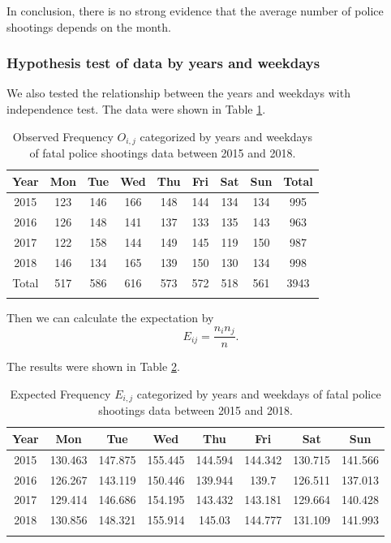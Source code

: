 \documentclass[conf]{new-aiaa}
\begin{document}
In conclusion, there is no strong evidence that the
average number of police shootings depends on the month.

\subsubsection{Hypothesis test of data by years and weekdays}

We also tested the relationship between the years and weekdays with independence test. The data were shown in Table \ref{tab:q4-year-day-obs}.

\begin{table}[!htbp]
\centering
\begin{tabular}{c|ccccccc|c}
\toprule 
\toprule
Year & Mon & Tue & Wed & Thu & Fri & Sat & Sun & Total \\
\hline
2015 & 123 & 146 & 166 & 148 & 144 & 134 & 134 & 995\\
2016 & 126 & 148 & 141 & 137 & 133 & 135 & 143 & 963\\
2017 & 122 & 158 & 144 & 149 & 145 & 119 & 150 & 987\\
2018 & 146 & 134 & 165 & 139 & 150 & 130 & 134 & 998\\
\hline
Total & 517 & 586 & 616 & 573 & 572 & 518 & 561 & 3943\\
\bottomrule 
\bottomrule\noalign{\bigskip}
\end{tabular}
\caption{Observed Frequency $O_{i,j}$ categorized by years and weekdays of fatal police shootings data between 2015 and 2018.}
\label{tab:q4-year-day-obs}
\end{table}

Then we can calculate the expectation by
$$E_{ij}=\frac{n_in_j}{n}.$$

The results were shown in Table \ref{tab:q4-year-day-exp}.

\begin{table}[!htbp]
\centering
\begin{tabular}{c|ccccccc}
\toprule 
\toprule
Year & Mon & Tue & Wed & Thu & Fri & Sat & Sun  \\
\hline
2015 & 130.463 & 147.875 & 155.445 & 144.594 & 144.342 & 130.715 & 141.566 \\
2016 & 126.267 & 143.119 & 150.446 & 139.944 & 139.7 & 126.511 & 137.013 \\
2017 & 129.414 & 146.686 & 154.195 & 143.432 & 143.181 & 129.664 & 140.428 \\
2018 & 130.856 & 148.321 & 155.914 & 145.03 & 144.777 & 131.109 & 141.993 \\
\bottomrule 
\bottomrule\noalign{\bigskip}
\end{tabular}
\caption{Expected Frequency $E_{i,j}$ categorized by years and weekdays of fatal police shootings data between 2015 and 2018.}
\label{tab:q4-year-day-exp}
\end{table}
\end{document}
